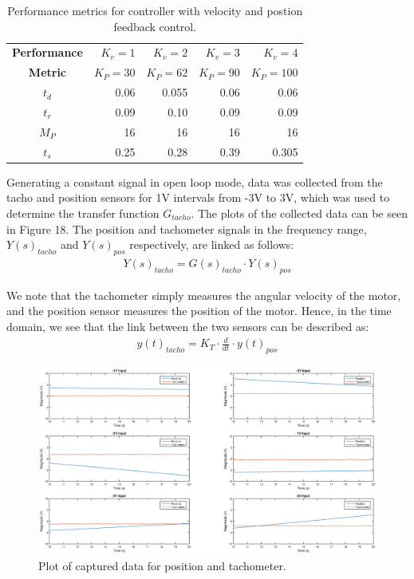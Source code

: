 \documentclass{article}
\begin{document}
\begin{table}[H]
	\centering
	\caption{Performance metrics for controller with velocity and postion feedback control.}
	\begin{tabular}{crrrr}
		\toprule
		\textbf{Performance} 	& $K_v = 1$ & $K_v=2$ 	& $K_v=3$ 	& $K_v=4$ \\
		\textbf{Metric} 		& $K_P=30$ 	& $K_P=62$ 	& $K_P=90$	& $K_P=100$ \\
		\midrule
		$t_d$ & 0.06 & 0.055 & 0.06 & 0.06\\
		$t_r$ & 0.09 & 0.10 & 0.09 & 0.09\\
		$M_P$ & 16 & 16 & 16 & 16\\
		$t_s$ & 0.25 & 0.28 & 0.39 & 0.305\\
		\bottomrule
	\end{tabular}
\end{table}

\newpage

Generating a constant signal in open loop mode, data was collected from the tacho and position sensors for 1$\si{\volt}$ intervals from -3$\si{\volt}$ to 3$\si{\volt}$, which was used to determine the transfer function $G_{tacho}$. The plots of the collected data can be seen in Figure 18. The position and tachometer signals in the frequency range, $Y(s)_{tacho}$ and $Y(s)_{pos}$ respectively, are linked as follows:
\begin{align*}
	Y(s)_{tacho} = G(s)_{tacho} \cdot Y(s)_{pos}
\end{align*}

We note that the tachometer simply measures the angular velocity of the motor, and the position sensor measures the position of the motor. Hence, in the time domain, we see that the link between the two sensors can be described as:
\begin{align*}
y(t)_{tacho} = K_T \cdot \frac{d}{dt} \cdot y(t)_{pos}
\end{align*}

\begin{figure}[H]\hspace{-10mm}
	\centering
	\includegraphics[scale=0.25]{fig20}
	\caption{Plot of captured data for position and tachometer.}
\end{figure}
\end{document}
